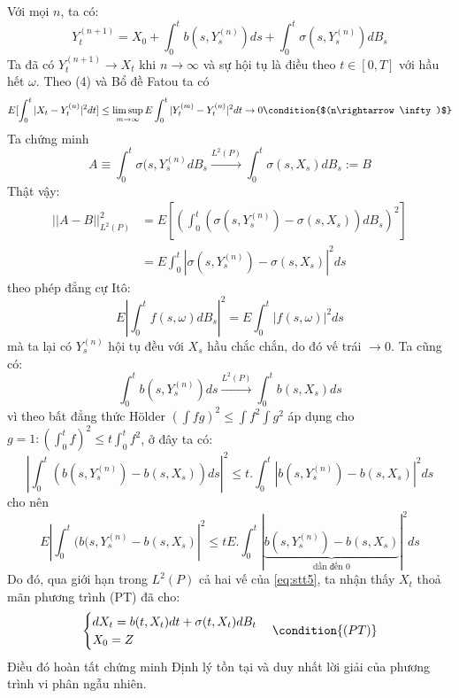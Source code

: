 \documentclass[a4paper]{article}
\numberwithin{equation}{section}
\begin{document}
Với mọi $n$, ta có:
\begin{equation}\label{eq:stt5}
	Y_t^{(n+1)}=X_0+\int_0^tb(s,Y_s^{(n)})ds+\int_0^t\sigma(s,Y_s^{(n)})dB_s
\end{equation}
Ta đã có $Y_t^{(n+1)}\rightarrow X_t$ khi $n\rightarrow\infty$ và sự hội tụ là điều theo $t\in[0,T]$ với hầu hết $\omega$. Theo (4) và Bổ đề Fatou ta có
\begin{equation*}
	E[\int_0^t|X_t-Y_t^{(n)}|^2dt]\leq\limsup_{m\rightarrow\infty}E\int_0^t|Y_t^{(m)}-Y_t^{(n)}|^2dt\rightarrow0\condition{$(n\rightarrow\infty)$}
\end{equation*}
Ta chứng minh
\begin{equation*}
	A\equiv\int_0^t\sigma(s,Y_s^{(n)}dB_s\xrightarrow{L^2(P)}\int_0^t\sigma(s,X_s)dB_s:=B
\end{equation*}
Thật vậy:
\begin{equation*}
	\begin{split}
		||A-B||^2_{L^2(P)}&=E\left[(\int_0^t(\sigma(s,Y_s^{(n)})-\sigma(s,X_s))dB_s)^2\right]\\
		&=E\int_0^t|\sigma(s,Y_s^{(n)})-\sigma(s,X_s)|^2ds
	\end{split}
\end{equation*}
theo phép đẳng cự Itô:
\begin{equation*}
	E\left|\int_0^tf(s,\omega)dB_s \right|^2=E\int_0^t|f(s,\omega)|^2ds
\end{equation*}
mà ta lại có $Y_s^{(n)}$ hội tụ đều với $X_s$ hầu chắc chắn, do đó vế trái $\rightarrow0$. Ta cũng có:
\begin{equation*}
	\int_0^tb(s,Y_s^{(n)})ds\xrightarrow{L^2(P)}\int_0^tb(s,X_s)ds
\end{equation*}
vì theo bất đẳng thức Hölder $(\int fg)^2\leq\int f^2 \int g^2$ áp dụng cho $g=1:(\int_0^t f)^2\leq t\int_0^t f^2$, ở đây ta có:
\begin{equation*}
	\left|\int_0^t(b(s,Y_s^{(n)})-b(s,X_s))ds \right|^2\leq t.\int_0^t|b(s,Y_s^{(n)})-b(s,X_s)|^2ds
\end{equation*}
cho nên
\begin{equation*}
	E\left|\int_0^t(b(s,Y_s^{(n)}-b(s,X_s) \right|^2\leq tE.\int_0^t|\underbrace{ b(s,Y_s^{(n)})-b(s,X_s)}_{\text{dần đến 0}}|^2ds
\end{equation*}
Do đó, qua giới hạn trong $L^2(P)$ cả hai vế của \eqref{eq:stt5}, ta nhận thấy $X_t$ thoả mãn phương trình (PT) đã cho:
\begin{equation*}
	\begin{cases}
		dX_t=b(t,X_t)dt+\sigma(t,X_t)dB_t\\
		X_0=Z
	\end{cases}\condition{(PT)}
\end{equation*}
Điều đó hoàn tất chứng minh Định lý tồn tại và duy nhất lời giải của phương trình vi phân ngẫu nhiên.
\end{document}
